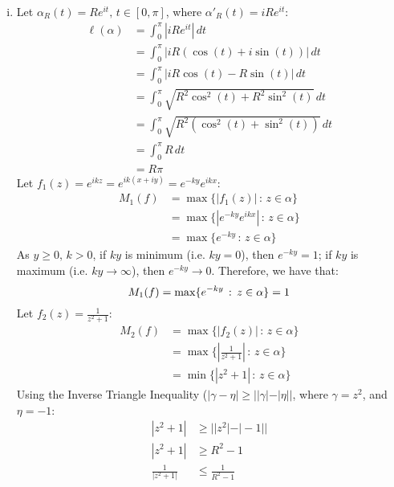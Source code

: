 \documentclass[a4paper, titlepage, DIV=14]{scrartcl}
\begin{document}
\begin{enumerate}[i)]
        \item Let $\alpha_{R}(t)=Re^{it}, \, t\in[0,\pi]$, where $\alpha'_{R}(t) = iRe^{it}$: 
        \begin{align*}
            \ell(\alpha) &= \int_{0}^{\pi}|iRe^{it}| \, dt \\
                &= \int_{0}^{\pi}|iR(\cos(t) + i\sin(t))| \, dt \\ 
                &= \int_{0}^{\pi}|iR\cos(t) - R\sin(t)| \, dt \\ 
                &= \int_{0}^{\pi} \sqrt{R^{2}\cos^{2}(t) + R^{2}\sin^{2}(t)} \, dt \\ 
                &= \int_{0}^{\pi} \sqrt{R^{2}(\cos^{2}(t) + \sin^{2}(t))} \, dt \\    
                &= \int_{0}^{\pi} R \, dt \\  
                &= R\pi   
        \end{align*}
        Let $f_{1}(z) = e^{ikz}=e^{ik(x+iy)} = e^{-ky}e^{ikx}$:
        \begin{align*}
            M_{1}(f) &= \max\{|f_{1}(z)| \, : \, z\in\alpha\}  \\
                &= \max\{|e^{-ky}e^{ikx}| \, : \, z\in\alpha\} \\
                &= \max\{e^{-ky}\, : \, z\in\alpha\} 
        \end{align*}
        As $y\geq0, \, k>0$, if $ky$ is minimum (i.e. $ky=0$), then $e^{-ky} = 1$; if $ky$ is maximum (i.e. $ky \to \infty$), 
        then $e^{-ky} \to 0$. Therefore, we have that:
        \begin{equation}
            M_{1}(f) = \max\{e^{-ky}\, : \, z\in\alpha\} = 1 \label{eq:m1f} \\
        \end{equation}
        Let $f_{2}(z) = \frac{1}{z^{2}+1}$:
        \begin{align*}
            M_{2}(f) &= \max\{|f_{2}(z)| \, : \, z\in\alpha\} \\
                &= \max\{|\frac{1}{z^{2}+1}| \, : \, z\in\alpha\} \\
                &= \min\{|z^{2}+1| \, : \, z\in\alpha\} 
        \end{align*}
        Using the Inverse Triangle Inequality ($|\gamma - \eta| \geq ||\gamma| - |\eta||$, where $\gamma = z^{2}$, and $\eta = -1$:
        \begin{align}
            |z^{2} + 1| &\geq ||z^{2}| - |-1|| \nonumber \\
            |z^{2} + 1| &\geq R^{2} - 1 \nonumber \\
            \frac{1}{|z^{2} + 1|} &\leq \frac{1}{R^{2} - 1} \label{eq:m2f} 
        \end{align}


\end{enumerate}
\end{document}

